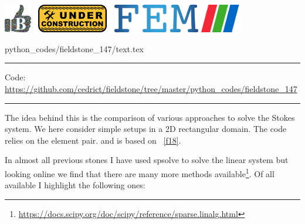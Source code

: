 \noindent
\includegraphics[height=1.25cm]{images/pictograms/benchmark}
\includegraphics[height=1.25cm]{images/pictograms/under_construction}
\includegraphics[height=1.25cm]{images/pictograms/FEM}
\includegraphics[height=1.25cm]{images/pictograms/paraview}



\begin{flushright} {\tiny {\color{gray} python\_codes/fieldstone\_147/text.tex}} \end{flushright}



\par\noindent\rule{\textwidth}{0.4pt}

\begin{center}
\inpython
{\small Code: \url{https://github.com/cedrict/fieldstone/tree/master/python_codes/fieldstone_147}}
\end{center}

\par\noindent\rule{\textwidth}{0.4pt}


The idea behind this \stone is the comparison of various approaches to solve the 
Stokes system. We here consider simple setups in a 2D rectangular domain. 
The code relies on the \QtwoQone element pair.
and is based on \stone~\ref{f18}.

In almost all previous stones I have used {\python spsolve} to solve the linear system
but looking online we find that there are many more methods 
available\footnote{\url{https://docs.scipy.org/doc/scipy/reference/sparse.linalg.html}}.
Of all available I highlight the following ones:

